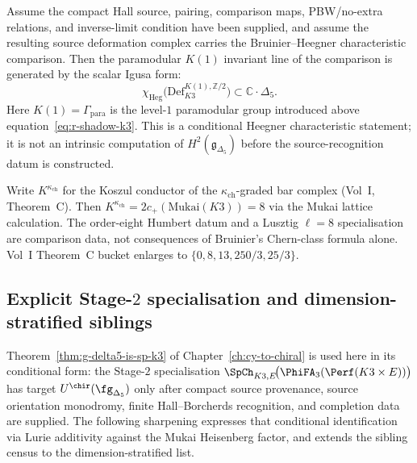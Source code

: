 \begin{remark}
\label{rem:k3e-cy3-platonic-classification}
Assume the compact Hall source, pairing, comparison maps, PBW/no-extra
relations, and inverse-limit condition have been supplied, and assume the
resulting source deformation complex carries the Bruinier--Heegner
characteristic comparison.  Then the paramodular \(K(1)\) invariant line
of the comparison is generated by the scalar Igusa form:
\[
\chi_{\mathrm{Heg}}\bigl(\mathrm{Def}_{K3}^{K(1),\mathbb Z/2}\bigr)
\subset \mathbb C\cdot\Delta_5 .
\]
Here \(K(1)=\Gamma_{\mathrm{para}}\) is the level-\(1\) paramodular group
introduced above equation~\eqref{eq:r-shadow-k3}.  This is a conditional
Heegner characteristic statement; it is not an intrinsic computation of
\(H^2(\mathfrak g_{\Delta_5})\) before the source-recognition datum is
constructed.
\end{remark}

\begin{remark}[Mukai doubling \texorpdfstring{$K^{\kappa_{\mathrm{ch}}}=8$}{K-kappa-ch=8}]
\label{rem:k3e-cy3-platonic-mukai}
Write \(K^{\kappa_{\mathrm{ch}}}\) for the Koszul conductor of the
\(\kappa_{\mathrm{ch}}\)-graded bar complex (Vol~I, Theorem~C). Then
\(K^{\kappa_{\mathrm{ch}}}=2c_+(\mathrm{Mukai}(K3))=8\) via the Mukai
lattice calculation. The order-eight Humbert datum and a Lusztig
\(\ell=8\) specialisation are comparison data, not consequences of
Bruinier's Chern-class formula alone. Vol~I Theorem~C bucket enlarges
to \(\{0,8,13,250/3,25/3\}\).
\end{remark}

\subsection{Explicit Stage-\texorpdfstring{$2$}{2} specialisation and dimension-stratified siblings}
\label{subsec:k3e-cy3-platonic-sp-siblings}

Theorem~\ref{thm:g-delta5-is-sp-k3} of Chapter~\ref{ch:cy-to-chiral} is used here in its conditional form: the Stage-$2$ specialisation $\SpCh_{K3, E}\!\bigl(\PhiFA_3(\Perf(K3 \times E))\bigr)$ has target $U^{\chir}(\fg_{\Delta_5})$ only after compact source provenance, source orientation monodromy, finite Hall--Borcherds recognition, and completion data are supplied. The following sharpening expresses that conditional identification via Lurie additivity against the Mukai Heisenberg factor, and extends the sibling census to the dimension-stratified list.

